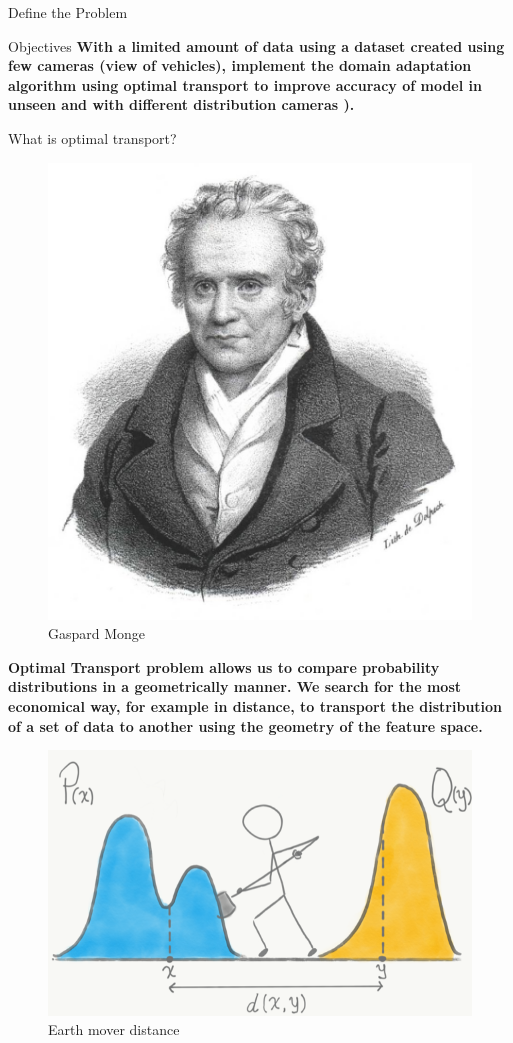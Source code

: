 \documentclass[final]{beamer}
\newlength{\onecolwid}
\begin{document}
\begin{frame}[t]
\begin{columns}[t]
\begin{column}{\onecolwid}
\begin{block}{Define the Problem}
\end{block}    
          
\begin{block}{Objectives}
\textbf{With a limited amount of data using a dataset created using few cameras (view of vehicles), implement the domain adaptation algorithm using optimal transport to improve accuracy of model in unseen and with different distribution cameras ).}
\end{block}

\begin{block}{What is optimal transport?}

\begin{minipage}{0.4\textwidth}
    \begin{figure}[H]
        \includegraphics[width=0.7\linewidth]{images/gm.jpg}
        \caption{Gaspard Monge}
    \end{figure}
\end{minipage} \hfill
\begin{minipage}{0.6\textwidth}
    \textbf{Optimal Transport problem allows us to compare probability distributions in a geometrically manner. We search for the most economical way, for example in distance, to transport the distribution of a set of data to another using the geometry of the feature space.}
\end{minipage}

\begin{figure}
    \includegraphics[width=0.45\linewidth]{images/OT_shovel.png}
    \caption{Earth mover distance}
\end{figure}


\end{block}
\end{column}
\end{columns}
\end{frame}
\end{document}
